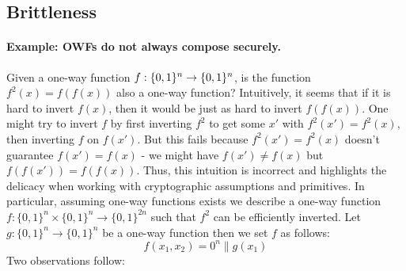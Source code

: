 \subsection{Brittleness}
\paragraph{Example: OWFs do not always compose securely.}
Given a one-way function $f : \{0,1\}^{n}\rightarrow\{0,1\}^{n}$, is the function $f^2(x) = f(f(x))$ also a one-way function?  Intuitively, it seems that if it is hard to invert $f(x)$, then it would be just as hard to invert $f(f(x))$.  One might try to invert $f$ by first inverting $f^2$ to get some $x'$ with $f^2(x') = f^2(x)$, then inverting $f$ on $f(x')$. But this fails because $f^2(x') = f^2(x)$ doesn't guarantee $f(x') = f(x)$ - we might have $f(x') \neq f(x)$ but $f(f(x')) = f(f(x))$.
Thus, this intuition is incorrect and highlights the delicacy when working with cryptographic assumptions and primitives. In particular, assuming one-way functions exists we describe a one-way function $f: \{0,1\}^{n}\times \{0,1\}^{n} \rightarrow \{0,1\}^{2n}$ such that $f^2$ can be efficiently inverted.
Let $g: \{0,1\}^n \rightarrow \{0,1\}^n$ be a one-way function then we set $f$ as follows:
$$f(x_1,x_2) = 0^{n}\|g(x_1)$$
Two observations follow:
